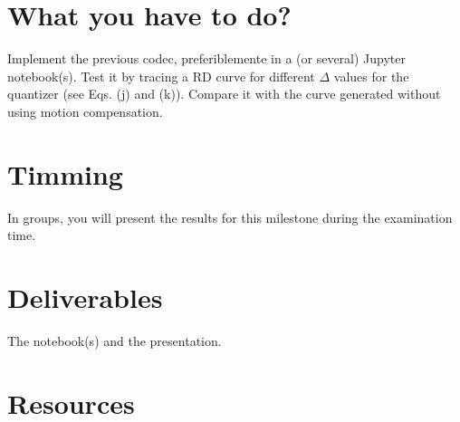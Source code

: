 \section{What you have to do?}

Implement the previous codec, preferiblemente in a (or several)
Jupyter notebook(s). Test it by tracing a RD curve for different
$\Delta$ values for the quantizer (see Eqs. (j) and (k)). Compare it
with the curve generated without using motion compensation.

\section{Timming}

In groups, you will present the results for this milestone during the
examination time.

\section{Deliverables}

The notebook(s) and the presentation.

\section{Resources}


